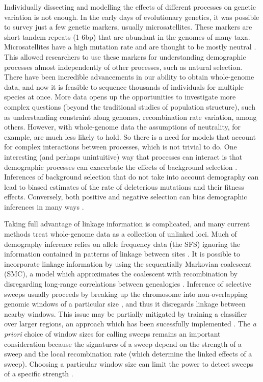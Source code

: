 Individually dissecting and modelling the effects of different processes on genetic variation is not enough.
In the early days of evolutionary genetics, it was possible to survey just a few genetic markers, usually microsatellites.
These markers are short tandem repeats (1-6bp) that are abundant in the genomes of many taxa.
Microsatellites have a high mutation rate and are thought to be mostly neutral \citep{field_long_1997}.
This allowed researchers to use these markers for understanding demographic processes almost independently of other processes, such as natural selection.
There have been incredible advancements in our ability to obtain whole-genome data,
and now it is feasible to sequence thousands of individuals for multiple species at once.
More data opens up the opportunities to investigate more complex questions (\ie beyond the traditional studies of population structure),
such as understanding constraint along genomes, recombination rate variation, among others.
However, with whole-genome data the assumptions of neutrality, for example, are much less likely to hold.
So there is a need for models that account for complex interactions between processes, which is not trivial to do.
One interesting (and perhaps unintuitive) way that processes can interact is that demographic processes can exacerbate the effects of background selection \citep{torres_human_2018, torres_temporal_2020}.
Inferences of background selection that do not take into account demography can lead to biased estimates of the rate of deleterious mutations and their fitness effects.
Conversely, both positive and negative selection can bias demographic inferences in many ways \citep{schrider_effects_2016, ewing_consequences_2016, johri_impact_2021}.

Taking full advantage of linkage information is complicated,
and many current methods treat whole-genome data as a collection of unlinked loci.
Much of demography inference relies on allele frequency data (\ie the SFS) ignoring the information contained in patterns of linkage between sites \citep{gutenkunst_inferring_2009, schraiber_methods_2015}.
It is possible to incorporate linkage information by using the sequentially Markovian coalescent (SMC),
a model which approximates the coalescent with recombination by disregarding long-range correlations between genealogies \citep{schraiber_methods_2015, li_inference_2011, harris_inferring_2013}.
Inference of selective sweeps usually proceeds by breaking up the chromosome into non-overlapping genomic windows of a particular size \citep{degiorgio_sweepfinder2_2016, pavlidis_sweed_2013, garud_recent_2015}, and thus it disregards linkage between nearby windows.
This issue may be partially mitigated by training a classifier over larger regions,
an approach which has been sucessfully implemented \citep{schrider_shic_2016, schrider_soft_2017}.
The \emph{a priori} choice of window sizes for calling sweeps remains an important consideration
because the signatures of a sweep depend on the strength of a sweep and the local recombination rate (which determine the linked effects of a sweep).
Choosing a particular window size can limit the power to detect sweeps of a specific strength \citep{caldas_inference_2022}.

